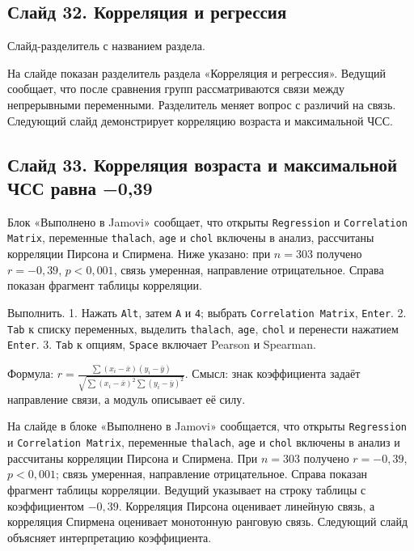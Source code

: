 \documentclass[11pt,a4paper]{article}
\begin{document}
\subsection*{Слайд 32. Корреляция и регрессия}
\begin{onslide}
Слайд-разделитель с названием раздела.
\end{onslide}
На слайде показан разделитель раздела «Корреляция и регрессия». Ведущий сообщает, что после сравнения групп рассматриваются связи между непрерывными переменными. Разделитель меняет вопрос с различий на связь. Следующий слайд демонстрирует корреляцию возраста и максимальной ЧСС.

\subsection*{Слайд 33. Корреляция возраста и максимальной ЧСС равна −0,39}
\begin{onslide}
Блок «Выполнено в Jamovi» сообщает, что открыты \texttt{Regression} и \texttt{Correlation Matrix}, переменные \texttt{thalach}, \texttt{age} и \texttt{chol} включены в анализ, рассчитаны корреляции Пирсона и Спирмена. Ниже указано: при $n = 303$ получено $r = -0{,}39$, $p < 0{,}001$, связь умеренная, направление отрицательное. Справа показан фрагмент таблицы корреляции.
\end{onslide}
\begin{jamovi}
Выполнить. 1. Нажать \texttt{Alt}, затем \texttt{A} и \texttt{4}; выбрать \texttt{Correlation Matrix}, \texttt{Enter}. 2. \texttt{Tab} к списку переменных, выделить \texttt{thalach}, \texttt{age}, \texttt{chol} и перенести нажатием \texttt{Enter}. 3. \texttt{Tab} к опциям, \texttt{Space} включает Pearson и Spearman.
\par Формула: $r=\frac{\sum(x_i-\bar{x})(y_i-\bar{y})}{\sqrt{\sum(x_i-\bar{x})^2\sum(y_i-\bar{y})^2}}$. Смысл: знак коэффициента задаёт направление связи, а модуль описывает её силу.
\end{jamovi}
На слайде в блоке «Выполнено в Jamovi» сообщается, что открыты \texttt{Regression} и \texttt{Correlation Matrix}, переменные \texttt{thalach}, \texttt{age} и \texttt{chol} включены в анализ и рассчитаны корреляции Пирсона и Спирмена. При $n = 303$ получено $r = -0{,}39$, $p < 0{,}001$; связь умеренная, направление отрицательное. Справа показан фрагмент таблицы корреляции. Ведущий указывает на строку таблицы с коэффициентом $-0{,}39$. Корреляция Пирсона оценивает линейную связь, а корреляция Спирмена оценивает монотонную ранговую связь. Следующий слайд объясняет интерпретацию коэффициента.
\end{document}
